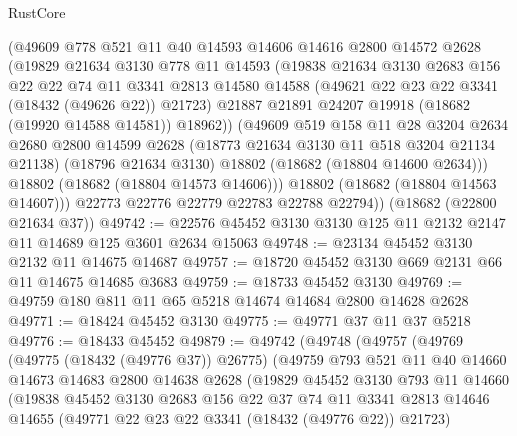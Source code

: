 \begin{lexlean}{RustCore}
\begin{coremodule}
          (@49609
            @778
            @521
            @11
            @40
            @14593
            @14606
            @14616
            @2800
            @14572
            @2628
            (@19829
              @21634
              @3130
              @778
              @11
              @14593
              (@19838
                @21634
                @3130
                @2683
                @156
                @22
                @22
                @74
                @11
                @3341
                @2813
                @14580
                @14588
                (@49621 @22 @23 @22 @3341 (@18432 (@49626 @22)) @21723)
                @21887
                @21891
                @24207
                @19918
                (@18682 (@19920 @14588 @14581))
                @18962))
            (@49609
              @519
              @158
              @11
              @28
              @3204
              @2634
              @2680
              @2800
              @14599
              @2628
              (@18773 @21634 @3130 @11 @518 @3204 @21134 @21138)
              (@18796 @21634 @3130)
              @18802
              (@18682 (@18804 @14600 @2634)))
            @18802
            (@18682 (@18804 @14573 @14606)))
          @18802
          (@18682 (@18804 @14563 @14607)))
        @22773
        @22776
        @22779
        @22783
        @22788
        @22794))
    (@18682 (@22800 @21634 @37))
@49742 := @22576 @45452 @3130 @3130 @125 @11 @2132 @2147 @11 @14689 @125 @3601 @2634 @15063
@49748 := @23134 @45452 @3130 @2132 @11 @14675 @14687
@49757 := @18720 @45452 @3130 @669 @2131 @66 @11 @14675 @14685 @3683
@49759 := @18733 @45452 @3130
@49769 := @49759 @180 @811 @11 @65 @5218 @14674 @14684 @2800 @14628 @2628
@49771 := @18424 @45452 @3130
@49775 := @49771 @37 @11 @37 @5218
@49776 := @18433 @45452
@49879 := @49742
    (@49748
      (@49757
        (@49769
          (@49775 (@18432 (@49776 @37)) @26775)
          (@49759
            @793
            @521
            @11
            @40
            @14660
            @14673
            @14683
            @2800
            @14638
            @2628
            (@19829
              @45452
              @3130
              @793
              @11
              @14660
              (@19838
                @45452
                @3130
                @2683
                @156
                @22
                @37
                @74
                @11
                @3341
                @2813
                @14646
                @14655
                (@49771 @22 @23 @22 @3341 (@18432 (@49776 @22)) @21723)

\end{coremodule}
\end{lexlean}
